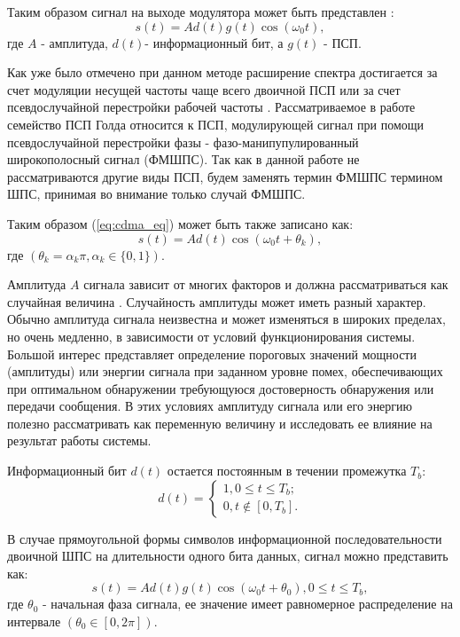 Таким образом сигнал на выходе модулятора может быть представлен \cite{shahtarin_sync}:
\begin{equation}
	\label{eq:cdma_eq}
	s(t)=Ad(t)g(t)\cos{(\omega_{0}t)},
\end{equation}
где ${A}$ - амплитуда, ${d(t)}$- информационный бит, а ${g(t)}$ - ПСП.

Как уже было отмечено при данном методе
расширение спектра достигается за счет модуляции несущей частоты чаще всего двоичной ПСП или за счет псевдослучайной перестройки рабочей частоты \cite{borisovBook}.
Рассматриваемое в работе семейство ПСП Голда относится к ПСП, модулирующей сигнал при помощи псевдослучайной перестройки фазы - фазо-манипупулированный широкополосный сигнал
(ФМШПС). Так как в данной работе не рассматриваются другие виды ПСП, будем заменять термин ФМШПС термином ШПС, принимая во внимание только случай ФМШПС.

Таким образом (\ref{eq:cdma_eq}) может быть также записано как:
\begin{equation}
	\label{eq:cdma_eq_phi}
	s(t)=Ad(t)\cos{(\omega_{0}t + \theta_k)},
\end{equation}
где ${(\theta_k=\alpha_k \pi, \alpha_k \in \{0, 1\})}$.

Амплитуда ${A}$ сигнала зависит от многих факторов и должна рассматриваться как случайная величина \cite{pestryakov-book}. Случайность
амплитуды может иметь разный характер. Обычно амплитуда сигнала неизвестна и может изменяться в широких пределах,
но очень медленно, в зависимости от условий функционирования системы. Большой интерес представляет определение пороговых
значений мощности (амплитуды) или энергии сигнала при заданном уровне помех, обеспечивающих при оптимальном
обнаружении требующуюся достоверность обнаружения или передачи сообщения. В этих условиях амплитуду сигнала или его энергию
полезно рассматривать как переменную величину и исследовать ее влияние на результат работы системы.

Информационный бит ${d(t)}$ остается постоянным в течении промежутка ${T_b}$:
\begin{equation}
	\label{eq:cdma_eq_data}
	 d(t) = \begin{cases}
		1, 0 \le t \le T_b; \\
		0, t \not\in [0, T_b].
		\end{cases}
\end{equation}

В случае прямоугольной формы символов информационной последовательности двоичной ШПС на длительности одного бита данных, сигнал можно представить как:
\begin{equation}
	\label{eq:cdma_eq_phi}
	s(t)=Ad(t)g(t)\cos{(\omega_{0}t + \theta_0)}, 0 \le t \le T_b,
\end{equation}
где ${\theta_0}$ - начальная фаза сигнала, ее значение имеет равномерное распределение на интервале ${(\theta_0 \in [0, 2\pi])}$.

